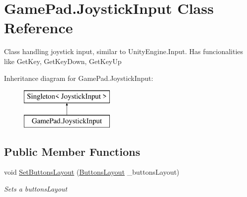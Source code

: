 \hypertarget{class_game_pad_1_1_joystick_input}{}\section{Game\+Pad.\+Joystick\+Input Class Reference}
\label{class_game_pad_1_1_joystick_input}


Class handling joystick input, similar to Unity\+Engine.\+Input. Has funcionalities like Get\+Key, Get\+Key\+Down, Get\+Key\+Up  


Inheritance diagram for Game\+Pad.\+Joystick\+Input\+:\begin{figure}[H]
\begin{center}
\leavevmode
\includegraphics[height=2.000000cm]{class_game_pad_1_1_joystick_input}
\end{center}
\end{figure}
\subsection*{Public Member Functions}
\begin{DoxyCompactItemize}
\item 
void \mbox{\hyperlink{class_game_pad_1_1_joystick_input_a68adb847c36d3474e134de85e1908184}{Set\+Buttons\+Layout}} (\mbox{\hyperlink{class_game_pad_1_1_buttons_layout}{Buttons\+Layout}} \+\_\+buttons\+Layout)
\begin{DoxyCompactList}\small\item\em Sets a buttons\+Layout \end{DoxyCompactList}\end{DoxyCompactItemize}
